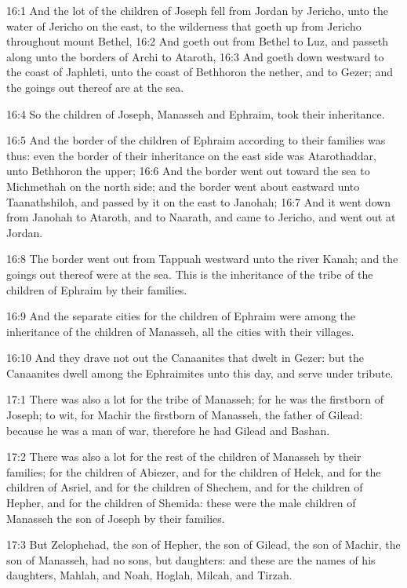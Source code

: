 16:1 And the lot of the children of Joseph fell from Jordan by
Jericho, unto the water of Jericho on the east, to the wilderness that
goeth up from Jericho throughout mount Bethel, 16:2 And goeth out from
Bethel to Luz, and passeth along unto the borders of Archi to Ataroth,
16:3 And goeth down westward to the coast of Japhleti, unto the coast
of Bethhoron the nether, and to Gezer; and the goings out thereof are
at the sea.

16:4 So the children of Joseph, Manasseh and Ephraim, took their
inheritance.

16:5 And the border of the children of Ephraim according to their
families was thus: even the border of their inheritance on the east
side was Atarothaddar, unto Bethhoron the upper; 16:6 And the border
went out toward the sea to Michmethah on the north side; and the
border went about eastward unto Taanathshiloh, and passed by it on the
east to Janohah; 16:7 And it went down from Janohah to Ataroth, and to
Naarath, and came to Jericho, and went out at Jordan.

16:8 The border went out from Tappuah westward unto the river Kanah;
and the goings out thereof were at the sea. This is the inheritance of
the tribe of the children of Ephraim by their families.

16:9 And the separate cities for the children of Ephraim were among
the inheritance of the children of Manasseh, all the cities with their
villages.

16:10 And they drave not out the Canaanites that dwelt in Gezer: but
the Canaanites dwell among the Ephraimites unto this day, and serve
under tribute.

17:1 There was also a lot for the tribe of Manasseh; for he was the
firstborn of Joseph; to wit, for Machir the firstborn of Manasseh, the
father of Gilead: because he was a man of war, therefore he had Gilead
and Bashan.

17:2 There was also a lot for the rest of the children of Manasseh by
their families; for the children of Abiezer, and for the children of
Helek, and for the children of Asriel, and for the children of
Shechem, and for the children of Hepher, and for the children of
Shemida: these were the male children of Manasseh the son of Joseph by
their families.

17:3 But Zelophehad, the son of Hepher, the son of Gilead, the son of
Machir, the son of Manasseh, had no sons, but daughters: and these are
the names of his daughters, Mahlah, and Noah, Hoglah, Milcah, and
Tirzah.

